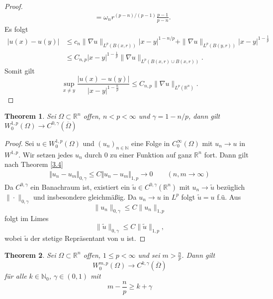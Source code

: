 \documentclass[
paper=a4,
bibtotocnumbered,
liststotocnumbered,
tablecaptionabove,
pointlessnumbers,
twoside,
openright,
10pt
]
{report}
\newtheorem{thm}{Theorem}[chapter]
\theoremstyle{definition}
\numberwithin{equation}{chapter}
\begin{document}
\begin{proof}
\begin{align*}
	&= \omega_n r^{(p-n)/(p-1)}\frac{p-1}{p-n}.
\end{align*}
Es folgt
\begin{align*}
	|u(x)-u(y)| &\le c_n \| \nabla u\|_{L^p(B(x,r))} |x-y|^{1-n/p} +\| \nabla u\|_{L^p(B(y,r))} |x-y|^{1-\frac{1}{p}}\\
&\le C_{n,p} |x-y|^{1-\frac{1}{p}}\|\nabla u \|_{L^p(B(x,r)\cup B(x,r))}.
\end{align*}
Somit gilt
\begin{equation}
	\sup_{x\ne y} \frac{|u(x)-u(y)|}{{|x-y|}^{1-\frac{n}{p}}} \le C_{n,p} \| \nabla u\|_{L^p(\mathbb R^n)}.
\end{equation}
\end{proof}

\begin{thm}\label{3.5}
	Sei $\Omega \subset \mathbb R^n$ offen, $n<p<\infty$ und $\gamma = 1- n/p$, dann gilt $W_0^{1,p}(\Omega) \to C^{0,\gamma}(\overline{\Omega})$
\end{thm}
\begin{proof}
	Sei $u\in W_0^{1,p}(\Omega)$ und $(u_n)_{n \in \mathbb{N}}$ eine Folge in $C_0^\infty(\Omega)$ mit $u_n \to u$ in $W^{1,p}$. Wir setzen  jedes $u_n$ durch $0$ zu einer Funktion auf ganz $\mathbb R^n$ fort. Dann gilt nach Theorem \ref{3.4} 
	\begin{align*}
	\Vert u_n - u_m \Vert_{0, \gamma} \leq C \Vert u_n - u_m \Vert_{1,p} \rightarrow 0 \qquad (n,m \rightarrow \infty)
	\end{align*}
Da $C^{0,\gamma}$ ein Banachraum ist, existiert ein $\tilde u \in C^{0,\gamma}(\mathbb R^n)$ mit $u_n\to \tilde u$ bezüglich $\| \cdot \|_{0,\gamma}$ und insbesondere gleichmäßig. Da $u_n \to u$ in $L^p$ folgt $\tilde u =u$ f.ü. Aus 
	\begin{equation}
		\|u_n\|_{0,\gamma} \le C \|u_n\|_{1,p}
	\end{equation}
folgt im Limes 
	\begin{equation}
		\|\tilde u \|_{0,\gamma} \le C\| \tilde u\|_{1,p},
	\end{equation}
	wobei $\tilde u$ der stetige Repräsentant von $u$ ist.
\end{proof}
\begin{thm}\label{thm 3.6}
	Sei $\Omega \subset \mathbb R^n$ offen, $1\le p < \infty$ und sei $m>\frac{n}{p}$. Dann gilt
	\begin{equation}
	W_0^{m,p}(\Omega) \to C^{k, \gamma}(\overline{\Omega})
	\end{equation}
	für alle $k\in \mathbb N_0$, $\gamma \in (0,1)$ mit 
	\begin{equation}
	m-\frac{n}{p} \ge k + \gamma
\end{equation}
\end{thm}
\end{document}
